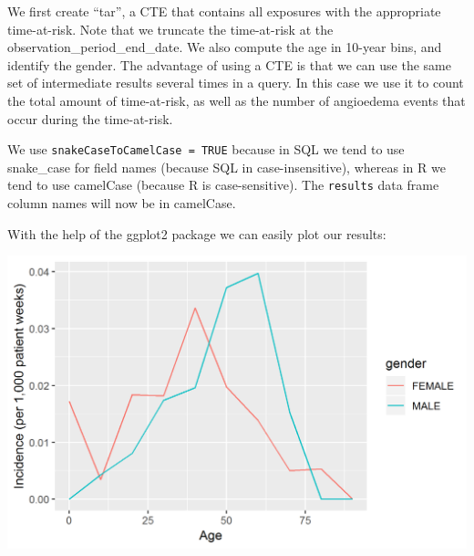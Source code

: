 \documentclass[11pt]{book}
\newenvironment{Shaded}{\begin{snugshade}}{\end{snugshade}}
\newcommand{\CommentTok}[1]{\textcolor[rgb]{0.56,0.35,0.01}{\textit{#1}}}
\newcommand{\DataTypeTok}[1]{\textcolor[rgb]{0.13,0.29,0.53}{#1}}
\newcommand{\DecValTok}[1]{\textcolor[rgb]{0.00,0.00,0.81}{#1}}
\newcommand{\KeywordTok}[1]{\textcolor[rgb]{0.13,0.29,0.53}{\textbf{#1}}}
\newcommand{\NormalTok}[1]{#1}
\newcommand{\OperatorTok}[1]{\textcolor[rgb]{0.81,0.36,0.00}{\textbf{#1}}}
\newcommand{\StringTok}[1]{\textcolor[rgb]{0.31,0.60,0.02}{#1}}
\theoremstyle{definition}
\theoremstyle{definition}
\theoremstyle{definition}
\theoremstyle{remark}
\begin{document}
We first create ``tar'', a CTE that contains all exposures with the appropriate time-at-risk. Note that we truncate the time-at-risk at the observation\_period\_end\_date. We also compute the age in 10-year bins, and identify the gender. The advantage of using a CTE is that we can use the same set of intermediate results several times in a query. In this case we use it to count the total amount of time-at-risk, as well as the number of angioedema events that occur during the time-at-risk.

We use \texttt{snakeCaseToCamelCase\ =\ TRUE} because in SQL we tend to use snake\_case for field names (because SQL in case-insensitive), whereas in R we tend to use camelCase (because R is case-sensitive). The \texttt{results} data frame column names will now be in camelCase.

With the help of the ggplot2 package we can easily plot our results:

\begin{Shaded}
\end{Shaded}

\begin{center}\includegraphics[width=0.8\linewidth]{images/SqlAndR/ir} \end{center}
\end{document}
